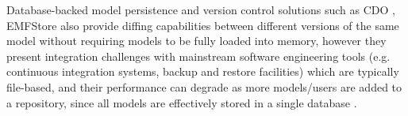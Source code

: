 
Database-backed model persistence and version control solutions such as CDO \cite{eclipse2019cdo}, EMFStore \cite{koegel2010emfstore} also provide diffing capabilities between different versions of the same model without requiring models to be fully loaded into memory, however they present integration challenges with mainstream software engineering tools (e.g. continuous integration systems, backup and restore facilities) which are typically file-based, and their performance can degrade as more models/users are added to a repository, since all models are effectively stored in a single database \cite{KolovosRMPGCLRV13}.


